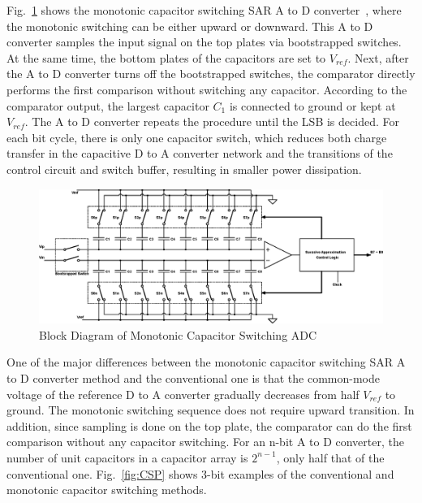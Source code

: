 \par
\hspace{1.2cm} Fig.~\ref{fig:MADC} shows the monotonic capacitor switching SAR A to D converter~\cite{5437496}, where the monotonic switching can be either upward or downward. This A to D converter samples the input signal on the top plates via bootstrapped switches. At the same time, the bottom plates of the capacitors are set to $V_{ref}$. Next, after the A to D converter turns off the bootstrapped switches, the comparator directly performs the first comparison without switching any capacitor. According to the comparator output, the largest capacitor $C_{1}$ is connected to ground or kept at $V_{ref}$. The A to D converter repeats the procedure until the LSB is decided. For each bit cycle, there is only one capacitor switch, which reduces both charge transfer in the capacitive D to A converter network and the transitions of the control circuit and switch buffer, resulting in smaller power dissipation. 


\begin{figure}[ht]
	\begin{center}
		\includegraphics[scale=0.68]{./Figures/WorkingDAC.eps}
		\caption{Block Diagram of Monotonic Capacitor Switching ADC}
		\label{fig:MADC}
	\end{center}
\end{figure}



\par
\hspace{1.2cm} One of the major differences between the monotonic capacitor switching SAR A to D converter method and the conventional one is that the common-mode voltage of the reference D to A converter gradually decreases from half $V_{ref}$ to ground. The monotonic switching sequence does not require upward transition. In addition, since sampling is done on the top plate, the comparator can do the first comparison without any capacitor switching. For an n-bit A to D converter, the number of unit capacitors in a capacitor array is $2^{n-1}$, only half that of the conventional one. Fig.~\ref{fig:CSP} shows 3-bit examples of the conventional and monotonic capacitor switching methods.

